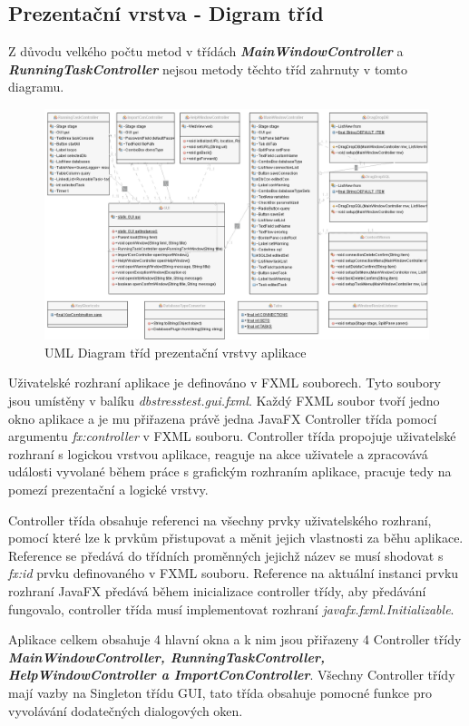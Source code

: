 \documentclass[czech,bachelor,public,dept460,male,cpdeclaration,twoside]{diploma}
\begin{document}
\newpage
\subsection{Prezentační vrstva - Digram tříd} \label{prezent}
Z důvodu velkého počtu metod v třídách \textbf{\emph{MainWindowController}} a \textbf{\emph{RunningTaskController}} nejsou metody těchto tříd zahrnuty v tomto diagramu.

\begin{figure}[!htbp]\centering\includegraphics[width=1.0\textwidth]{Figures/PresentLayerDiagram.png}\caption{UML Diagram tříd prezentační vrstvy aplikace}
\end{figure}

Uživatelské rozhraní aplikace je definováno v FXML souborech. Tyto soubory jsou umístěny v balíku \textit{dbstresstest.gui.fxml}. Každý FXML soubor tvoří jedno okno aplikace a je mu přiřazena právě jedna JavaFX Controller třída pomocí argumentu \textit{fx:controller} v FXML souboru. Controller třída propojuje uživatelské rozhraní s logickou vrstvou aplikace, reaguje na akce uživatele a zpracovává události vyvolané během práce s grafickým rozhraním aplikace, pracuje tedy na pomezí prezentační a logické vrstvy.

Controller třída obsahuje referenci na všechny prvky uživatelského rozhraní, pomocí které lze k prvkům přistupovat a měnit jejich vlastnosti za běhu aplikace. Reference se předává do třídních proměnných jejichž název se musí shodovat s \textit{fx:id} prvku definovaného v FXML souboru. Reference na aktuální instanci prvku rozhraní JavaFX předává během inicializace controller třídy, aby předávání fungovalo, controller třída musí implementovat rozhraní \textit{javafx.fxml.Initializable}.

Aplikace celkem obsahuje 4 hlavní okna a k nim jsou přiřazeny 4 Controller třídy \newline \textbf{\emph{MainWindowController, RunningTaskController, HelpWindowController a ImportConController}}. Všechny Controller třídy mají vazby na Singleton třídu GUI, tato třída obsahuje pomocné funkce pro vyvolávání dodatečných dialogových oken. 
\end{document}
